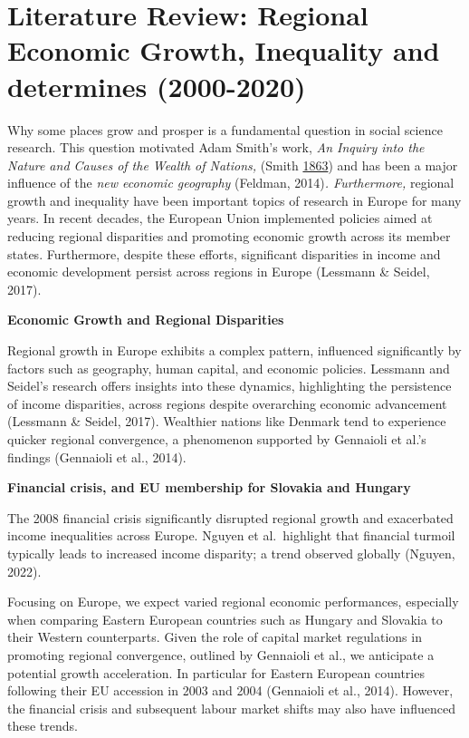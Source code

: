 \documentclass[
  a4paper,
  DIV=11,
  numbers=noendperiod]{scrartcl}
\begin{document}
\hypertarget{literature-review-regional-economic-growth-inequality-and-determines-2000-2020}{%
\section{Literature Review: Regional Economic Growth, Inequality and
determines
(2000-2020)}\label{literature-review-regional-economic-growth-inequality-and-determines-2000-2020}}

Why some places grow and prosper is a fundamental question in social
science research. This question motivated Adam Smith's work, \emph{An
Inquiry into the Nature and Causes of the Wealth of Nations,} (Smith
\href{https://link-springer-com.galanga.hvl.no/article/10.1007/s11187-014-9574-4\#ref-CR32}{1863})
and has been a major influence of the \emph{new economic geography}
(Feldman, 2014)\emph{. Furthermore,} regional growth and inequality have
been important topics of research in Europe for many years. In recent
decades, the European Union implemented policies aimed at reducing
regional disparities and promoting economic growth across its member
states. Furthermore, despite these efforts, significant disparities in
income and economic development persist across regions in Europe
(Lessmann \& Seidel, 2017).

\textbf{Economic Growth and Regional Disparities}

Regional growth in Europe exhibits a complex pattern, influenced
significantly by factors such as geography, human capital, and economic
policies. Lessmann and Seidel's research offers insights into these
dynamics, highlighting the persistence of income disparities, across
regions despite overarching economic advancement (Lessmann \& Seidel,
2017). Wealthier nations like Denmark tend to experience quicker
regional convergence, a phenomenon supported by Gennaioli et al.'s
findings (Gennaioli et al., 2014).

\textbf{Financial crisis, and EU membership for Slovakia and Hungary}

The 2008 financial crisis significantly disrupted regional growth and
exacerbated income inequalities across Europe. Nguyen et al.~highlight
that financial turmoil typically leads to increased income disparity; a
trend observed globally (Nguyen, 2022).

Focusing on Europe, we expect varied regional economic performances,
especially when comparing Eastern European countries such as Hungary and
Slovakia to their Western counterparts. Given the role of capital market
regulations in promoting regional convergence, outlined by Gennaioli et
al., we anticipate a potential growth acceleration. In particular for
Eastern European countries following their EU accession in 2003 and 2004
(Gennaioli et al., 2014). However, the financial crisis and subsequent
labour market shifts may also have influenced these trends.
\end{document}
